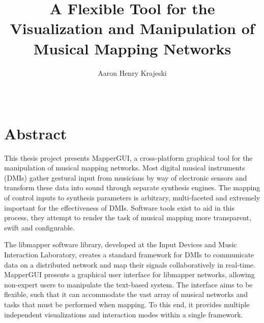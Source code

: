\documentclass [12pt,letterpaper]{report}
\begin{document}

\title{A Flexible Tool for the Visualization and Manipulation of Musical Mapping Networks}
\author{Aaron Henry Krajeski}
\date{\Month\ \number\year}

\maketitle

\raggedbottom
\onehalfspacing
{}

\section*{\centering Abstract}

This thesis project presents MapperGUI, a cross-platform graphical tool for the manipulation of musical mapping networks. Most digital musical instruments (DMIs) gather gestural input from musicians by way of electronic sensors and transform these data into sound through separate synthesis engines. The mapping of control inputs to synthesis parameters is arbitrary, multi-faceted and extremely important for the effectiveness of DMIs. Software tools exist to aid in this process, they attempt to render the task of musical mapping more transparent, swift and configurable. 

The libmapper software library, developed at the Input Devices and Music Interaction Laboratory, creates a standard framework for DMIs to communicate data on a distributed network and map their signals collaboratively in real-time. MapperGUI presents a graphical user interface for libmapper networks, allowing non-expert users to manipulate the text-based system. The interface aims to be flexible, such that it can accommodate the vast array of musical networks and tasks that must be performed when mapping. To this end, it provides multiple independent visualizations and interaction modes within a single framework. 
\end{document}
